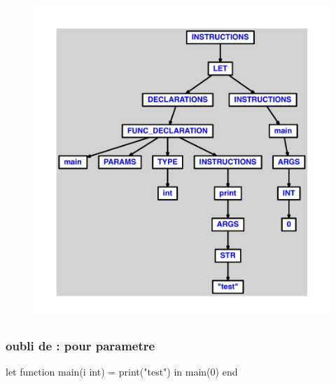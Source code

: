 \documentclass{article}
\begin{document}
\begin{figure}[H]\centering\includegraphics[max width=\textwidth]{ast/ast_208.pdf}\end{figure}\subsubsection{oubli de : pour parametre}
\begin{verbatimtab}
let
	function main(i int) = print("test")
in main(0) end
\end{verbatimtab}
\end{document}
